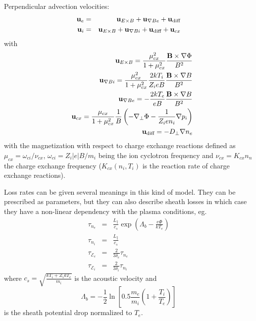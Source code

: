 Perpendicular advection velocities:
\begin{eqnarray}
{\bf u}_e & = & {\bf u}_{E \times B} + {\bf u}_{\nabla B e} + 
{\bf u}_\textrm{diff}\\
{\bf u}_i & = & {\bf u}_{E \times B} + {\bf u}_{\nabla B i} + 
{\bf u}_\textrm{diff} + {\bf u}_{cx}
\end{eqnarray}
with
\begin{eqnarray}
& & {\bf u}_{E \times B} = \frac{\mu_{cx}^2}{1+\mu_{cx}^2} 
\frac{{\bf B} \times \nabla \Phi }{B^2} \\
& & {\bf u}_{\nabla B i} = \frac{\mu_{cx}^2}{1+\mu_{cx}^2} \frac{2 
kT_i}{Z_i e B} \frac{{\bf B} \times \nabla B }{B^2} \\
& & {\bf u}_{\nabla B e} = -\frac{2 kT_e}{e B} \frac{{\bf B} \times 
\nabla B }{B^2} \\
& & {\bf u}_{cx} =  \frac{\mu_{cx}}{1+\mu_{cx}^2} \frac{1}{B} \left( 
-\nabla_\perp \Phi -\frac{1}{Z_i e n_i} \nabla p_i \right) 
\\
& & {\bf u}_\textrm{diff} = - {D_\perp} \nabla n_e
\end{eqnarray}
with the magnetization with respect to charge exchange reactions 
defined as $\mu_{cx}=\omega_{ci}/\nu_{cx}$, $\omega_{ci} = Z_i 
|e| B/m_i$ being the ion cyclotron frequency and $\nu_{cx}=K_{cx} n_n$ 
the charge exchange frequency ($K_{cx} \left( n_i, T_i \right)$ is the 
reaction rate of charge exchange reactions). 

Loss rates can be given several meanings in this kind of model. They 
can be prescribed as parameters, but they can also describe sheath 
losses in which case they have a non-linear dependency with the plasma 
conditions, eg.\ 
\begin{eqnarray}
\tau_{n_e} & = & \frac{L_\|}{c_s}\exp\left(\Lambda_b - \frac{e \Phi}{kT_e}\right) \\
\tau_{n_i} & = & \frac{{L_\|}}{c_s} \\
\tau_{\mathcal{E}_e} & = & \frac{2}{3 {\delta_e}} \tau_{n_e} \\
\tau_{\mathcal{E}_i} & = & \frac{2}{3 {\delta_i}} \tau_{n_i}
\end{eqnarray}
where $c_s = \sqrt{\frac{kT_i + {Z_i} kT_e}{{m_i}}}$ 
is the acoustic velocity and
\begin{equation}
\Lambda_b=-\frac{1}{2} \ln \left[ 0.5 
{\frac{m_e}{m_i}} \left( 1 + \frac{T_i}{T_e} \right)
\right]
\end{equation}
is the sheath potential drop normalized to $T_e$.

